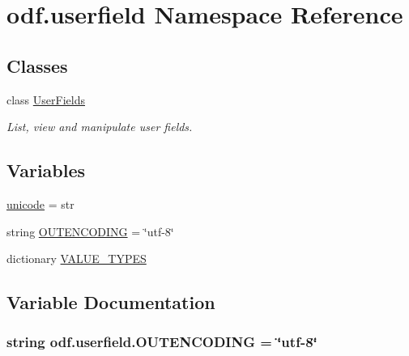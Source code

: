 \hypertarget{namespaceodf_1_1userfield}{\section{odf.\+userfield Namespace Reference}
\label{namespaceodf_1_1userfield}
}
\subsection*{Classes}
\begin{DoxyCompactItemize}
\item 
class \hyperlink{classodf_1_1userfield_1_1UserFields}{User\+Fields}
\begin{DoxyCompactList}\small\item\em List, view and manipulate user fields. \end{DoxyCompactList}\end{DoxyCompactItemize}
\subsection*{Variables}
\begin{DoxyCompactItemize}
\item 
\hyperlink{namespaceodf_1_1userfield_acbf030274e249b947b246cb243e604a3}{unicode} = str
\item 
string \hyperlink{namespaceodf_1_1userfield_ac0d2b936dc2daec018705cd7f643a475}{O\+U\+T\+E\+N\+C\+O\+D\+I\+N\+G} = \char`\"{}utf-\/8\char`\"{}
\item 
dictionary \hyperlink{namespaceodf_1_1userfield_a9a19426c5bf0ad246a4652644ae83885}{V\+A\+L\+U\+E\+\_\+\+T\+Y\+P\+E\+S}
\end{DoxyCompactItemize}


\subsection{Variable Documentation}
\hypertarget{namespaceodf_1_1userfield_ac0d2b936dc2daec018705cd7f643a475}{
\subsubsection[{O\+U\+T\+E\+N\+C\+O\+D\+I\+N\+G}]{\setlength{\rightskip}{0pt plus 5cm}string odf.\+userfield.\+O\+U\+T\+E\+N\+C\+O\+D\+I\+N\+G = \char`\"{}utf-\/8\char`\"{}}}\label{namespaceodf_1_1userfield_ac0d2b936dc2daec018705cd7f643a475}


